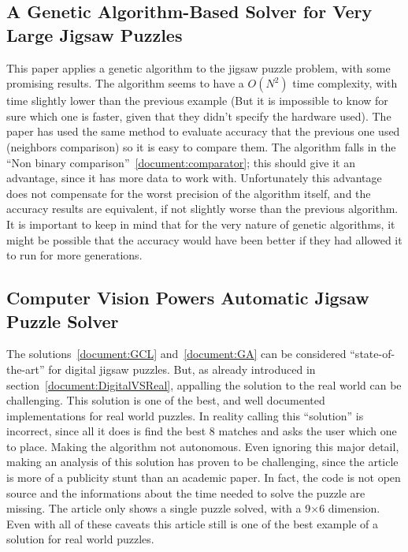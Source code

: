 \documentclass{article}
\begin{document}
\subsection{A Genetic Algorithm-Based Solver for Very Large Jigsaw Puzzles~\cite{GA}}
This paper applies a genetic algorithm to the jigsaw puzzle problem, with some promising results.\newline
The algorithm seems to have a \(O(N^2)\) time complexity, with time slightly lower than the previous example
(But it is impossible to know for sure which one is faster, given that they didn't specify the hardware used).\newline
The paper has used the same method to evaluate accuracy that the previous one used
(neighbors comparison) so it is easy to compare them.\newline
The algorithm falls in the “Non binary comparison”~\ref{document:comparator};
this should give it an advantage, since it has more data to work with.\newline
Unfortunately this advantage does not compensate for the worst precision
of the algorithm itself, and the accuracy results are equivalent,
if not slightly worse than the previous algorithm.\newline
It is important to keep in mind that for the very nature of genetic algorithms,
it might be possible that the accuracy would have been better if they had allowed
it to run for more generations.\label{document:GA}

\subsection{Computer Vision Powers Automatic Jigsaw Puzzle Solver~\cite{Abto}}
The solutions~\ref{document:GCL} and~\ref{document:GA} can be considered ``state-of-the-art'' for digital jigsaw puzzles.
But, as already introduced in section~\ref{document:DigitalVSReal},
appalling the solution to the real world can be challenging.\newline
This solution is one of the best, and well documented implementations for real world puzzles.\newline
In reality calling this ``solution'' is incorrect,
since all it does is find the best 8 matches and asks the user which one to place.
Making the algorithm not autonomous.\newline
Even ignoring this major detail, making an analysis of this solution has proven to be challenging,
since the article is more of a publicity stunt than an academic paper.
In fact, the code is not open source and the informations about the time needed to solve the puzzle are missing.\newline
The article only shows a single puzzle solved, with a 9$\times$6 dimension.\newline
Even with all of these caveats this article still is one of the best example of a solution for real world puzzles.
\end{document}
